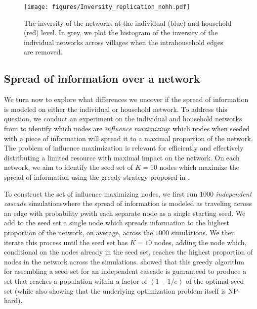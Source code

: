 \begin{figure}
    \centering
    \texttt{[image: figures/Inversity\_replication\_nohh.pdf]}
    \caption{The inversity of the \cite{banerjee2013} networks at the individual (blue) and household (red) level. In grey, we plot the histogram of the inversity of the individual networks across villages when the intrahousehold edges are removed.}
    \label{fig:inv_nohh}
\end{figure}

\subsection{Spread of information over a network}\label{subsec:inf_dif}

We turn now to explore what differences we uncover if the spread of information is modeled on either the individual or household network. To address this question, we conduct an experiment on the individual and household networks from \cite{banerjee2013} to identify which nodes are \textit{influence maximizing}: which nodes when seeded with a piece of information will spread it to a maximal proportion of the network. The problem of influence maximization is relevant for efficiently and effectively distributing a limited resource with maximal impact on the network. On each network, we aim to identify the seed set of $K=10$ nodes which maximize the spread of information using the greedy strategy proposed in \cite{kempe2003maximizing}. 

To construct the set of influence maximizing nodes, we first run $1000$ \textit{independent cascade} simulations\textemdash where the spread of information is modeled as traveling across an edge with probability $p$\textemdash with each separate node as a single starting seed. We add to the seed set a single node which spreads information to the highest proportion of the network, on average, across the $1000$ simulations. We then iterate this process until the seed set has $K=10$ nodes, adding the node which, conditional on the nodes already in the seed set, reaches the highest proportion of nodes in the network across the simulations. \cite{kempe2003maximizing} showed that this greedy algorithm for assembling a seed set for an independent cascade is guaranteed to produce a set that reaches a population within a factor of $(1-1/e)$ of the optimal seed set (while also showing that the underlying optimization problem itself is NP-hard).

